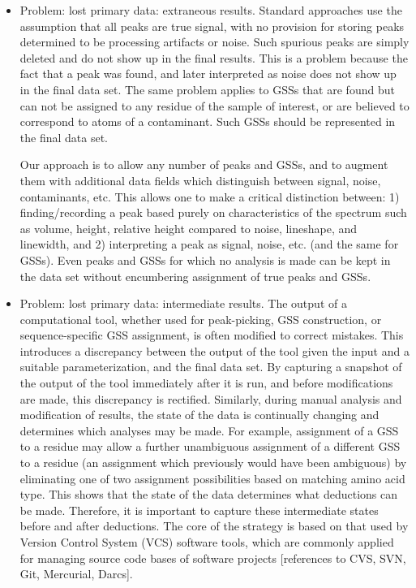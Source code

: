 \begin{itemize}
  \item Problem: lost primary data:  extraneous results.  Standard approaches use the 
assumption that all peaks are true signal, with no provision for storing peaks 
determined to be processing artifacts or noise.  Such spurious peaks are simply 
deleted and do not show up in the final results.  This is a problem because the 
fact that a peak was found, and later interpreted as noise does not show up in 
the final data set.  The same problem applies to GSSs that are found 
but can not be assigned to any residue of the sample of interest, or are 
believed to correspond to atoms of a contaminant.  Such GSSs should 
be represented in the final data set.

Our approach is to allow any number of peaks and GSSs, and to 
augment them with additional data fields which distinguish between signal, 
noise, contaminants, etc.  This allows one to make a critical distinction 
between: 1) finding/recording a peak based purely on characteristics of 
the spectrum such as volume, height, relative height compared to noise, 
lineshape, and linewidth, and 2) interpreting a peak as signal, noise, 
etc. (and the same for GSSs).  Even peaks and GSSs for 
which no analysis is made can be kept in the data set without encumbering 
assignment of true peaks and GSSs.

  \item Problem: lost primary data: intermediate results.  The output of a 
computational tool, whether used for peak-picking, GSS construction, 
or sequence-specific GSS assignment, is often modified to correct 
mistakes.  This introduces a discrepancy between the output of the tool 
given the input and a suitable parameterization, and the final data set.  
By capturing a snapshot of the output of the tool immediately after it is 
run, and before modifications are made, this discrepancy is rectified.
Similarly, during manual analysis and modification of results, the state of 
the data is continually changing and determines which analyses may be made.  
For example, assignment of a GSS to a residue may allow a further 
unambiguous assignment of a different GSS to a residue (an assignment 
which previously would have been ambiguous) by eliminating one of two 
assignment possibilities based on matching amino acid type.  This shows that 
the state of the data determines what deductions can be made.  Therefore, it 
is important to capture these intermediate states before and after deductions.
The core of the strategy is based on that used by Version Control System (VCS) 
software tools, which are commonly applied for managing source code bases of 
software projects \cite{loeliger2012git}
[references to CVS, SVN, Git, Mercurial, Darcs].  


\end{itemize}
